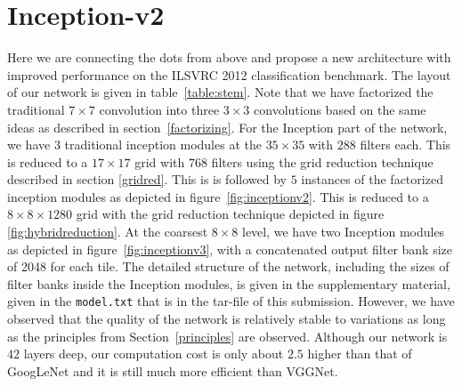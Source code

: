 \section{Inception-v2}
\label{revisited}
Here we are connecting the dots from above and propose a new
architecture with improved performance on the ILSVRC 2012
classification benchmark.
The layout of our network is given in table~\ref{table:stem}.
Note that we have factorized the traditional $7\times 7$ convolution into
three $3\times 3$ convolutions based on the same ideas as described in
section~\ref{factorizing}.
For the Inception part of the network, we have $3$ traditional
inception modules at  the $35\times 35$ with $288$ filters each.
This is reduced to a $17\times 17$ grid with $768$ filters using the
grid reduction technique described in section \ref{gridred}. This is
is followed by $5$ instances of the factorized inception modules as
depicted in figure~\ref{fig:inceptionv2}. This is reduced to a $8\times 8\times 1280$
grid with the grid reduction technique depicted in figure \ref{fig:hybridreduction}.
At the coarsest $8\times 8$ level, we have two Inception modules as depicted
in figure~\ref{fig:inceptionv3}, with a concatenated output filter bank size of
2048 for each tile. The detailed structure of the
network, including the sizes of filter banks inside the Inception modules,
is given in the supplementary material, given in the {\tt model.txt} that is in
the tar-file of this submission. However, we have observed that
the quality of the network is relatively stable to variations
as long as the principles from Section~\ref{principles} are observed.
Although our network is $42$ layers deep, our computation cost is only
about $2.5$ higher than that of GoogLeNet and it is still much more efficient than
VGGNet.

